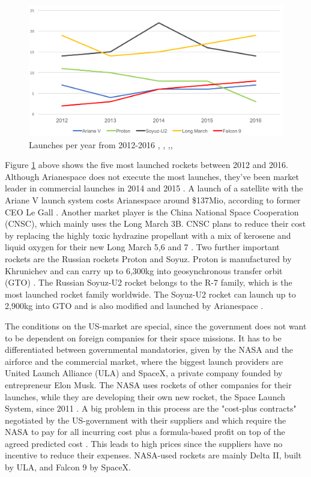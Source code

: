 \documentclass[11pt,a4paper]{article}
\begin{document}
\begin{figure}[!h]
    \includegraphics[width=1.0\textwidth]{image1.png}
    \centering
    \caption{Launches per year from 2012-2016 \cite{scs59}, \cite{scs61}, \cite{scs61},\cite{scs68}, \cite{scs69}}
    \label{figure1}
\end{figure}

Figure \ref{figure1} above shows the five most launched rockets between 2012 and 2016. Although Arianespace does not execute the most launches, they’ve been market leader in commercial launches in 2014 and 2015 \cite{scs64}. A launch of a satellite with the Ariane V launch system costs Arianespace around \$137Mio, according to former CEO Le Gall \cite{scs62}. Another market player is the China National Space Cooperation (CNSC), which mainly uses the Long March 3B. CNSC plans to reduce their cost by replacing the highly toxic hydrazine propellant with a mix of kerosene and liquid oxygen for their new Long March 5,6 and 7 \cite{scs63}.
Two further important rockets are the Russian rockets Proton and Soyuz. Proton is manufactured by Khrunichev and can carry up to 6,300kg into geosynchronous transfer orbit (GTO) \cite{scs70}. The Russian Soyuz-U2 rocket belongs to the R-7 family, which is the most launched rocket family worldwide. The Soyuz-U2 rocket can launch up to 2,900kg into GTO \cite{scs73} and is also modified and launched by Arianespace \cite{scs74}.

The conditions on the US-market are special, since the government does not want to be dependent on foreign companies for their space missions. It has to be differentiated between governmental mandatories, given by the NASA and the airforce and the commercial market, where the biggest launch providers are United Launch Alliance (ULA) and SpaceX, a private company founded by entrepreneur Elon Musk. The NASA uses rockets of other companies for their launches, while they are developing their own new rocket, the Space Launch System, since 2011 \cite{scs71}. A big problem in this process are the "cost-plus contracts" negotiated by the US-government with their suppliers and which require the NASA to pay for all incurring cost plus a formula-based profit on top of the agreed predicted cost \cite{scs72}. This leads to high prices since the suppliers have no incentive to reduce their expenses. NASA-used rockets are mainly Delta II, built by ULA, and Falcon 9 by SpaceX.
\end{document}

